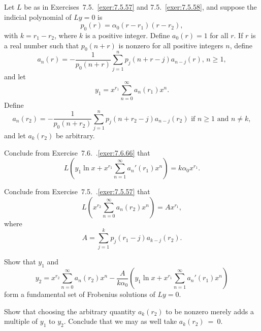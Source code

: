 \begin{exerciselist}
  \item\label{exer:7.7.48} Let $L$ be as in Exercises~7.5.~\hspace*{-3pt}\ref{exer:7.5.57} and
        7.5.~\hspace*{-3pt}\ref{exer:7.5.58}, and suppose the indicial polynomial of $Ly=0$ is
  \[
    p_{0}(r)=\alpha_{0}(r-r_{1})(r-r_{2}),
  \]
  with $k=r_{1}-r_{2}$, where $k$ is a positive integer. Define $a_{0}(r)=1$ for all $r$. If $r$ is
  a real number such that $p_{0}(n+r)$ is nonzero for all positive integers $n$, define
  \[
    a_{n}(r)=-\frac{1}{p_{0}(n+r)}\sum_{j=1}^{n}p_{j}(n+r-j)a_{n-j}(r),\,n\ge1,
  \]
  and let
  \[
    y_{1}=x^{r_{1}}\sum_{n=0}^{\infty}a_{n}(r_{1})x^{n}.
  \]
  Define
  \[
    a_{n}(r_{2})=-\frac{1}{p_{0}(n+r_{2})}\sum_{j=1}^{n}p_{j}(n+r_{2}-j)a_{n-j}(r_{2})\mbox{ if }n\ge1\mbox{ and }n\ne k,
  \]
  and let $a_{k}(r_{2})$ be arbitrary.
  \begin{alist}
    \item %
    Conclude from Exercise~7.6.~\hspace*{-3pt}.\ref{exer:7.6.66} that
    \[
      L\left(y_{1}\ln x+x^{r_{1}}\sum_{n=1}^{\infty}a_{n}'(r_{1})x^{n}\right)=k\alpha_{0}x^{r_{1}}.
    \]

    \item %
    Conclude from Exercise~7.5.~\hspace*{-3pt}.\ref{exer:7.5.57} that
    \[
      L\left(x^{r_{2}}\sum_{n=0}^{\infty}a_{n}(r_{2})x^{n}\right)=Ax^{r_{1}},
    \]
    where
    \[
      A=\sum_{j=1}^{k}p_{j}(r_{1}-j)a_{k-j}(r_{2}).
    \]

    \item %
    Show that $y_{1}$ and
    \[
      y_{2}=x^{r_{2}}\sum_{n=0}^{\infty}a_{n}(r_{2})x^{n}-\frac{A}{k\alpha_{0}}\left(y_{1}\ln x+x^{r_{1}}\sum_{n=1}^{\infty}a_{n}'(r_{1})x^{n}\right)
    \]
    form a fundamental set of Frobenius solutions of $Ly=0$.

    \item %
    Show that choosing the arbitrary quantity $a_{k}(r_{2})$ to be nonzero merely adds a multiple of
    $y_{1}$ to $y_{2}$. Conclude that we may as well take $a_{k}(r_{2})~=~0$.
  \end{alist}
\end{exerciselist}
